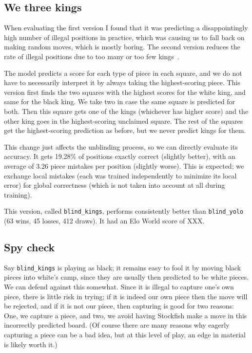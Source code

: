 \documentclass[twocolumn]{amsart}
\begin{document}
\subsection{We three kings}

When evaluating the first version I found that it was predicting a
disappointingly high number of illegal positions in practice, which
was causing us to fall back on making random moves, which is mostly
boring. The second version reduces the rate of illegal positions due
to too many or too few kings~\cite{kingme}.

The model predicts a score for each type of piece in each square, and
we do not have to necessarily interpret it by always taking the
highest-scoring piece. This version first finds the two squares with
the highest scores for the white king, and same for the black king. We
take two in case the same square is predicted for both. Then this
square gets one of the kings (whichever has higher score) and the
other king goes in the highest-scoring unclaimed square. The rest of
the squares get the highest-scoring prediction as before, but we never
predict kings for them.

This change just affects the unblinding process, so we can directly
evaluate its accuracy. It gets 19.28\% of positions exactly correct
(slightly better), with an average of 3.26 piece mistakes per position
(slightly worse). This is expected; we exchange local mistakes (each
was trained independently to minimize its local error) for global
correctness (which is not taken into account at all during training).

This version, called \verb+blind_kings+, performs consistently better
than \verb+blind_yolo+ (63 wins, 45 losses, 412 draws).
It had an Elo World score of XXX.

\subsection{Spy check} \label{sec:spycheck}

Say \verb+blind_kings+ is playing as black; it remains easy to fool it
by moving black pieces into white's camp, since they are usually then
predicted to be white pieces. We can defend against this somewhat.
Since it is illegal to capture one's own piece, there is little risk
in trying; if it is indeed our own piece then the move will be
rejected, and if it is not our piece, then capturing is good for two
reasons: One, we capture a piece, and two, we avoid having
Stockfish make a move in this incorrectly predicted board. (Of course
there are many reasons why eagerly capturing a piece can be a bad
idea, but at this level of play, an edge in material is likely worth
it.)
\end{document}
